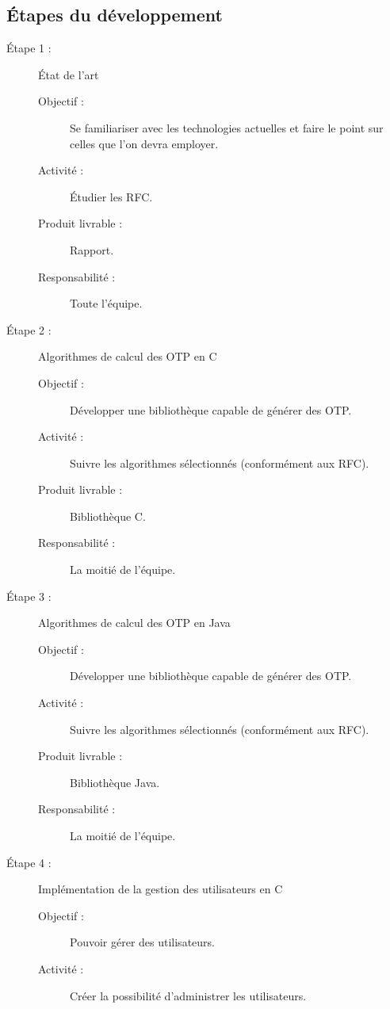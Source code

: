 \documentclass{../../res/univ-projet}
\begin{document}
\subsection{Étapes du développement}
	\begin{description}
		\item [Étape 1 :] État de l'art
			\begin{description}
		    	\item [Objectif :] Se familiariser avec les technologies actuelles et faire le point sur celles que l'on devra employer.
		        \item [Activité :] Étudier les RFC.
		        \item [Produit livrable :] Rapport.
		        \item [Responsabilité :] Toute l'équipe.
            \end{description}
	    \item [Étape 2 :] Algorithmes de calcul des OTP en C
		    \begin{description}
		        \item [Objectif :] Développer une bibliothèque capable de générer des OTP.
		        \item [Activité :] Suivre les algorithmes sélectionnés (conformément aux RFC).
		        \item [Produit livrable :] Bibliothèque C.
		        \item [Responsabilité :] La moitié de l'équipe.
		    \end{description}
	    \item [Étape 3 :] Algorithmes de calcul des OTP en Java
		    \begin{description}
		        \item [Objectif :] Développer une bibliothèque capable de générer des OTP.
		        \item [Activité :] Suivre les algorithmes sélectionnés (conformément aux RFC).
		        \item [Produit livrable :] Bibliothèque Java.
		        \item [Responsabilité :] La moitié de l'équipe.
		    \end{description}
	    \item [Étape 4 :] Implémentation de la gestion des utilisateurs en C
		    \begin{description}
		        \item [Objectif :] Pouvoir gérer des utilisateurs.
		        \item [Activité :] Créer la possibilité d'administrer les utilisateurs.

\end{description}
\end{description}
\end{document}

